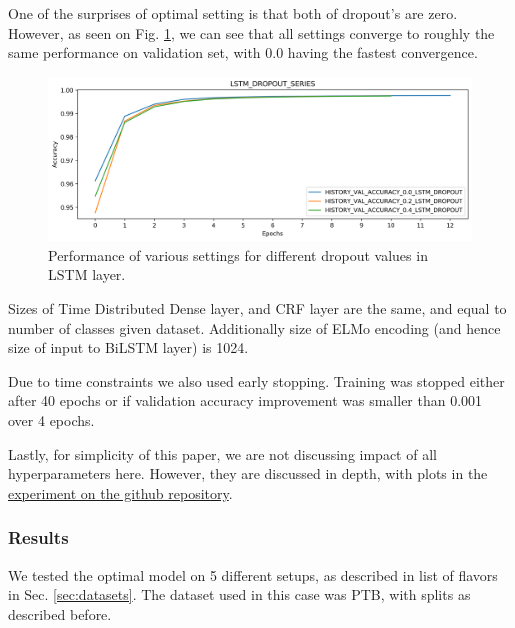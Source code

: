 \documentclass[11pt,a4paper]{article}
\begin{document}
    One of the surprises of optimal setting is that both of dropout's are zero. However, as seen on Fig. \ref{fig:pos-hyperdrop}, we can see that all settings converge to roughly the same performance on validation set, with $0.0$ having the fastest convergence.

    \begin{figure}[h]
        \centering
    	\includegraphics[scale=0.3]{pos_hypersearch_drop.png}
        \caption{Performance of various settings for different dropout values in LSTM layer.}
        \label{fig:pos-hyperdrop}
    \end{figure}

    Sizes of Time Distributed Dense layer, and CRF layer are the same, and equal to number of classes given dataset. Additionally size of ELMo encoding (and hence size of input to BiLSTM layer) is 1024.

    Due to time constraints we also used early stopping. Training was stopped either after 40 epochs or if validation accuracy improvement was smaller than 0.001 over 4 epochs.

    Lastly, for simplicity of this paper, we are not discussing impact of all hyperparameters here. However, they are discussed in depth, with plots in the \href{https://github.com/andreaskuster/uw-nlp/tree/master/pos}{experiment on the github repository}.

    \subsubsection{Results}
    We tested the optimal model on 5 different setups, as described in list of flavors in Sec. \ref{sec:datasets}. The dataset used in this case was PTB, with splits as described before.
\end{document}
